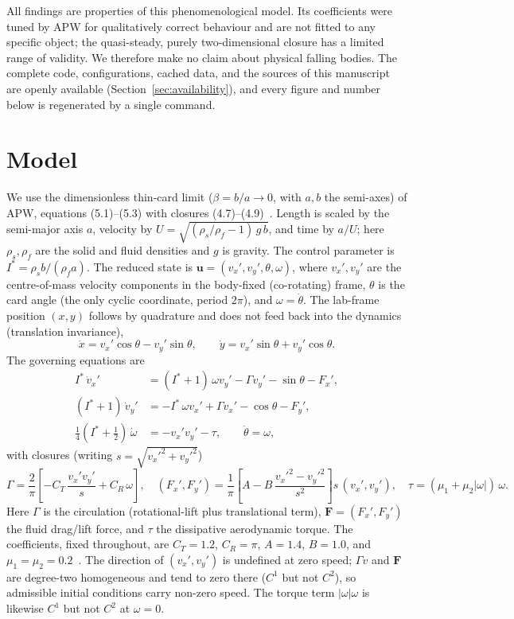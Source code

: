 \documentclass[11pt]{article}
\newcommand{\Is}{I^{*}}          %
\begin{document}
All findings are properties of this phenomenological model. Its coefficients were tuned by APW for
qualitatively correct behaviour and are not fitted to any specific object; the quasi-steady, purely
two-dimensional closure has a limited range of validity. We therefore make no claim about physical
falling bodies. The complete code, configurations, cached data, and the sources of this manuscript
are openly available (Section~\ref{sec:availability}), and every figure and number below is
regenerated by a single command.

\section{Model}\label{sec:model}

We use the dimensionless thin-card limit ($\beta=b/a\to0$, with $a,b$ the semi-axes) of APW,
equations (5.1)--(5.3) with closures (4.7)--(4.9)~\cite{apw91}. Length is scaled by the semi-major
axis $a$, velocity by $U=\sqrt{(\rho_s/\rho_f-1)\,g\,b}$, and time by $a/U$; here $\rho_s,\rho_f$ are
the solid and fluid densities and $g$ is gravity. The control parameter is $\Is=\rho_s b/(\rho_f a)$.
The reduced state is $\mathbf{u}=(v_x',v_y',\theta,\omega)$, where $v_x',v_y'$ are the centre-of-mass
velocity components in the body-fixed (co-rotating) frame, $\theta$ is the card angle (the only cyclic
coordinate, period $2\pi$), and $\omega=\dot\theta$. The lab-frame position $(x,y)$ follows by
quadrature and does not feed back into the dynamics (translation invariance),
\begin{equation}
\dot x = v_x'\cos\theta - v_y'\sin\theta,\qquad
\dot y = v_x'\sin\theta + v_y'\cos\theta.
\end{equation}
The governing equations are
\begin{align}
\Is\,\dot v_x' &= (\Is{+}1)\,\omega v_y' - \Gamma v_y' - \sin\theta - F_x', \\
(\Is{+}1)\,\dot v_y' &= -\Is\,\omega v_x' + \Gamma v_x' - \cos\theta - F_y', \\
\tfrac14(\Is{+}\tfrac12)\,\dot\omega &= -v_x' v_y' - \tau, \qquad \dot\theta = \omega,
\end{align}
with closures (writing $s=\sqrt{v_x'^2+v_y'^2}$)
\begin{equation}
\Gamma = \frac{2}{\pi}\!\left[-C_T\,\frac{v_x' v_y'}{s} + C_R\,\omega\right],\quad
(F_x',F_y') = \frac{1}{\pi}\!\left[A - B\,\frac{v_x'^2-v_y'^2}{s^2}\right] s\,(v_x',v_y'),\quad
\tau = (\mu_1+\mu_2|\omega|)\,\omega.
\end{equation}
Here $\Gamma$ is the circulation (rotational-lift plus translational term), $\mathbf{F}=(F_x',F_y')$
the fluid drag/lift force, and $\tau$ the dissipative aerodynamic torque. The coefficients, fixed
throughout, are $C_T=1.2$, $C_R=\pi$, $A=1.4$, $B=1.0$, and $\mu_1=\mu_2=0.2$~\cite{apw91,wbd04}. The
direction of $(v_x',v_y')$ is undefined at zero speed; $\Gamma v$ and $\mathbf{F}$ are degree-two
homogeneous and tend to zero there ($C^1$ but not $C^2$), so admissible initial conditions carry
non-zero speed. The torque term $|\omega|\omega$ is likewise $C^1$ but not $C^2$ at $\omega=0$.
\end{document}
